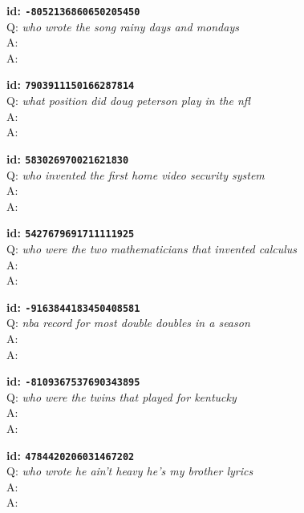 \tiny{\setlength{\parindent}{0cm}
\textbf{id: \texttt{-8052136860650205450}} \\
Q: \textit{who wrote the song rainy days and mondays} \\
A:  \\
A: }

\tiny{\setlength{\parindent}{0cm}
\textbf{id: \texttt{7903911150166287814}} \\
Q: \textit{what position did doug peterson play in the nfl} \\
A:  \\
A: }

\tiny{\setlength{\parindent}{0cm}
\textbf{id: \texttt{583026970021621830}} \\
Q: \textit{who invented the first home video security system} \\
A:  \\
A: }

\tiny{\setlength{\parindent}{0cm}
\textbf{id: \texttt{5427679691711111925}} \\
Q: \textit{who were the two mathematicians that invented calculus} \\
A:  \\
A: }

\tiny{\setlength{\parindent}{0cm}
\textbf{id: \texttt{-9163844183450408581}} \\
Q: \textit{nba record for most double doubles in a season} \\
A:  \\
A: }

\tiny{\setlength{\parindent}{0cm}
\textbf{id: \texttt{-8109367537690343895}} \\
Q: \textit{who were the twins that played for kentucky} \\
A:  \\
A: }

\tiny{\setlength{\parindent}{0cm}
\textbf{id: \texttt{4784420206031467202}} \\
Q: \textit{who wrote he ain't heavy he's my brother lyrics} \\
A:  \\
A: }

